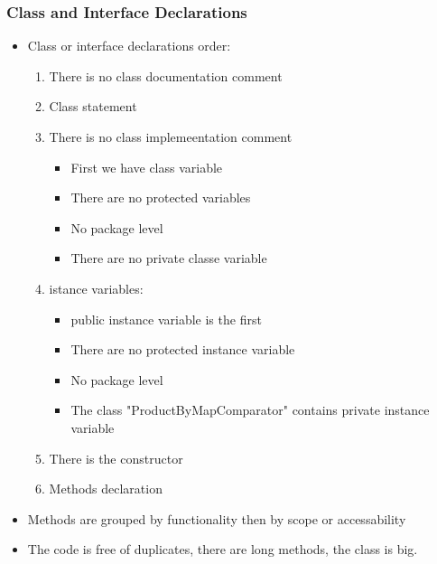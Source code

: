 \subsubsection{Class and Interface Declarations}
\begin{itemize}

\item Class or interface declarations order:\\
\begin{enumerate}
\item There is no class documentation comment\\
\item Class statement\\
\item There is no class implemeentation comment\\

\begin{itemize}
\item First we have class variable
\item There are no protected variables
\item No package level
\item There are no private classe variable
\end{itemize}
\item istance variables:
\begin{itemize}
\item public instance variable is the first
\item There are no protected instance variable
\item No package level
\item The class "ProductByMapComparator" contains private instance variable
\end{itemize}
\item There is the constructor
\item Methods declaration
\end{enumerate}
\item Methods are grouped by functionality then by scope or accessability
\item The code is free of duplicates, there are long methods, the class is big.
\end{itemize}

